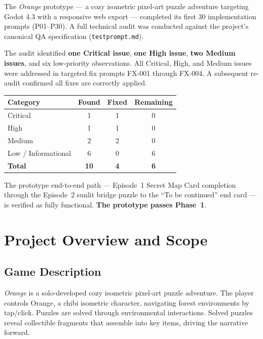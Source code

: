 \documentclass[12pt, a4paper]{article}
\begin{document}
The \textit{Orange} prototype — a cozy isometric pixel-art puzzle adventure
targeting Godot 4.3 with a responsive web export — completed its first 30
implementation prompts (P01--P30). A full technical audit was conducted
against the project's canonical QA specification (\texttt{testprompt.md}).

The audit identified \textbf{one Critical issue}, \textbf{one High issue},
\textbf{two Medium issues}, and six low-priority observations.
All Critical, High, and Medium issues were addressed in targeted fix prompts
FX-001 through FX-004. A subsequent re-audit confirmed all fixes are correctly
applied.

\begin{center}
\begin{tabular}{lccc}
\toprule
\textbf{Category} & \textbf{Found} & \textbf{Fixed} & \textbf{Remaining} \\
\midrule
Critical            & 1 & 1 & 0 \\
High                & 1 & 1 & 0 \\
Medium              & 2 & 2 & 0 \\
Low / Informational & 6 & 0 & 6 \\
\midrule
\textbf{Total}      & \textbf{10} & \textbf{4} & \textbf{6} \\
\bottomrule
\end{tabular}
\end{center}

The prototype end-to-end path — Episode~1 Secret Map Card completion through
the Episode~2 sunlit bridge puzzle to the ``To be continued'' end card —
is verified as fully functional. \textbf{The prototype passes Phase~1}.

\section{Project Overview and Scope}

\subsection{Game Description}

\textit{Orange} is a solo-developed cozy isometric pixel-art puzzle adventure.
The player controls Orange, a chibi isometric character, navigating forest
environments by tap/click. Puzzles are solved through environmental
interactions. Solved puzzles reveal collectible fragments that assemble into
key items, driving the narrative forward.
\end{document}
